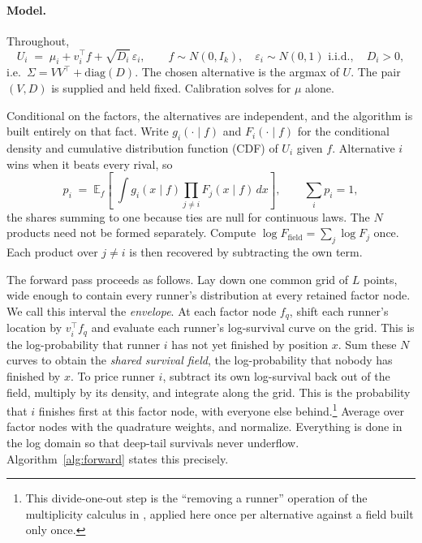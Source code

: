 \documentclass[12pt]{article}
\theoremstyle{remark}
\newcommand{\E}{\mathbb{E}}
\begin{document}
\paragraph{Model.} Throughout,
\begin{equation}
U_i \;=\; \mu_i + v_i^\top f + \sqrt{D_i}\,\varepsilon_i,
\qquad f \sim N(0, I_k), \quad \varepsilon_i \sim N(0,1) \text{ i.i.d.},
\quad D_i > 0,
\label{eq:model}
\end{equation}
i.e.\ $\Sigma = VV^\top + \mathrm{diag}(D)$. The chosen alternative is the
argmax of $U$. The pair $(V, D)$ is supplied and held fixed.
Calibration solves for $\mu$ alone.

Conditional on the factors, the alternatives are independent, and the
algorithm is built entirely on that fact. Write $g_i(\cdot \mid f)$ and
$F_i(\cdot \mid f)$ for the conditional density and cumulative distribution function (CDF) of $U_i$ given
$f$. Alternative $i$ wins when it beats every rival, so
\begin{equation}
p_i \;=\; \E_f\!\left[\;\int g_i(x \mid f)
\prod_{j \neq i} F_j(x \mid f)\, dx \right],
\qquad \sum_i p_i = 1,
\label{eq:forward}
\end{equation}
the shares summing to one because ties are null for continuous laws.
The $N$ products need not be formed
separately. Compute $\log F_{\mathrm{field}} = \sum_j \log F_j$ once.
Each product over $j \ne i$ is then recovered by subtracting the own
term.

The forward pass proceeds as follows. Lay down one common
grid of $L$ points, wide enough to contain every runner's distribution
at every retained factor node. We call this interval the
\emph{envelope}. At each factor node $f_q$, shift each
runner's location by $v_i^\top f_q$ and evaluate each runner's
log-survival curve on the grid. This is the log-probability that runner
$i$ has not yet finished by position $x$. Sum these $N$ curves to obtain the
\emph{shared survival field}, the log-probability that nobody has
finished by $x$. To price runner $i$, subtract its own log-survival
back out of the field, multiply by its density, and integrate along the
grid. This is the probability that $i$ finishes first at this factor
node, with everyone else behind.\footnote{This divide-one-out step is
the ``removing a runner'' operation of the multiplicity calculus in
\citet{cotton2021}, applied here once per alternative against a field
built only once.} Average over factor nodes with the
quadrature weights, and normalize. Everything is done in the log domain
so that deep-tail survivals never underflow. Algorithm~\ref{alg:forward}
states this precisely.
\end{document}
